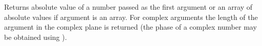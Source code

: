 Returns absolute value of a number passed as the first argument
or an array of absolute values if argument is an array. 
For complex arguments the length of the argument in the complex plane is returned
(the phase of a complex number may be obtained using ).
\gdlusesopenmp
